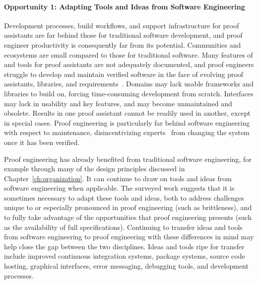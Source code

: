 \paragraph{Opportunity 1: Adapting Tools and Ideas from Software Engineering} %
Development processes, build workflows, and support infrastructure for proof assistants are far behind those for traditional software development, and proof engineer productivity is consequently far from its potential. Communities and ecosystems are small compared to those for traditional software.
Many features of and tools for proof assistants are not adequately documented, and proof engineers struggle to develop and maintain verified software in the face
of evolving proof assistants, libraries, and requirements~\citep{Bourke12}.
Domains may lack usable frameworks and libraries to build on, forcing time-consuming development from scratch.
Interfaces may lack in usability and key features, and may become unmaintained and obsolete.
Results in one proof assistant cannot be readily used in another, except in special cases.
Proof engineering is particularly far behind software engineering with respect to maintenance, disincentivizing experts~\citep{Elphinstone2013}
from changing the system once it has been verified.

Proof engineering has already benefited from traditional software engineering, for example through many of
the design principles discussed in Chapter~\ref{ch:organization}. It can continue to draw on tools and ideas from software engineering 
when applicable. The surveyed work suggests that it is sometimes necessary to adapt these tools and ideas,
both to address challenges unique to or especially pronounced in proof engineering (such as brittleness), and to fully take advantage of
the opportunities that proof engineering presents (such as the availability of full specifications).
Continuing to transfer ideas and tools from software engineering to proof engineering with these differences in mind may help close the gap between the two disciplines. Ideas and tools ripe for transfer include improved continuous integration systems, 
package systems, source code hosting, graphical interfaces, error messaging, debugging tools, and development processes.

